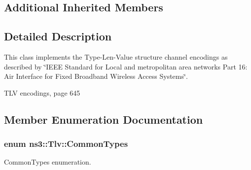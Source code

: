 \subsection*{Additional Inherited Members}


\subsection{Detailed Description}
This class implements the Type-\/\+Len-\/\+Value structure channel encodings as described by \char`\"{}\+I\+E\+E\+E Standard for
\+Local and metropolitan area networks Part 16\+: Air Interface for Fixed Broadband Wireless Access Systems\char`\"{}. 


\begin{DoxyEnumerate}
\item T\+LV encodings, page 645 
\end{DoxyEnumerate}

\subsection{Member Enumeration Documentation}
\subsubsection[{\texorpdfstring{Common\+Types}{CommonTypes}}]{\setlength{\rightskip}{0pt plus 5cm}enum {\bf ns3\+::\+Tlv\+::\+Common\+Types}}\hypertarget{classns3_1_1Tlv_ab275ea003645d46aada8e2b351de90e3}{}\label{classns3_1_1Tlv_ab275ea003645d46aada8e2b351de90e3}


Common\+Types enumeration. 

